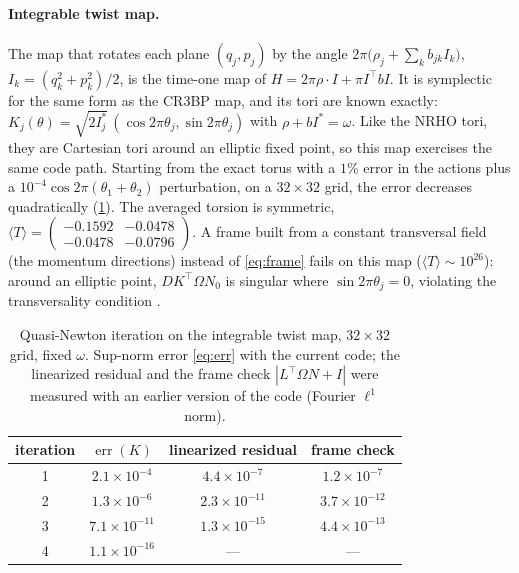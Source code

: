 \documentclass[11pt]{article}
\newcommand{\avg}[1]{\langle #1 \rangle}
\DeclareMathOperator{\err}{err}
\begin{document}
\paragraph{Integrable twist map.} The map that rotates each plane $(q_j,p_j)$ by the angle
$2\pi\big(\rho_j + \sum_k b_{jk} I_k\big)$, $I_k = (q_k^2+p_k^2)/2$, is the time-one map of
$H = 2\pi\rho\cdot I + \pi I^\top b I$. It is symplectic for the same form as the CR3BP map, and its
tori are known exactly: $K_j(\theta) = \sqrt{2I^*_j}\,(\cos 2\pi\theta_j, \sin 2\pi\theta_j)$ with
$\rho + bI^* = \omega$. Like the NRHO tori, they are Cartesian tori around an elliptic fixed point,
so this map exercises the same code path. Starting from the exact torus with a $1\%$ error in the
actions plus a $10^{-4}\cos 2\pi(\theta_1+\theta_2)$ perturbation, on a $32\times32$ grid, the
error decreases quadratically (\cref{tab:twist}). The averaged torsion is symmetric,
$\avg{T} = \left(\begin{smallmatrix}-0.1592 & -0.0478\\ -0.0478 & -0.0796\end{smallmatrix}\right)$.
A frame built from a constant transversal field (the momentum directions) instead of
\eqref{eq:frame} fails on this map ($\avg{T}\sim 10^{26}$): around an elliptic point,
$DK^\top\Omega N_0$ is singular where $\sin 2\pi\theta_j = 0$, violating the transversality
condition \cite[eq.~(7), p.~6]{figueras2017rigorous}.

\begin{table}[t]
\centering
\caption{Quasi-Newton iteration on the integrable twist map, $32\times32$ grid, fixed $\omega$.
Sup-norm error \eqref{eq:err} with the current code; the linearized residual and the frame check
$|L^\top\Omega N + I|$ were measured with an earlier version of the code (Fourier $\ell^1$ norm).}
\label{tab:twist}
\begin{tabular}{cccc}
\toprule
iteration & $\err(K)$ & linearized residual & frame check \\
\midrule
1 & $2.1\times10^{-4}$  & $4.4\times10^{-7}$  & $1.2\times10^{-7}$ \\
2 & $1.3\times10^{-6}$  & $2.3\times10^{-11}$ & $3.7\times10^{-12}$ \\
3 & $7.1\times10^{-11}$ & $1.3\times10^{-15}$ & $4.4\times10^{-13}$ \\
4 & $1.1\times10^{-16}$ & ---                 & --- \\
\bottomrule
\end{tabular}
\end{table}
\end{document}
